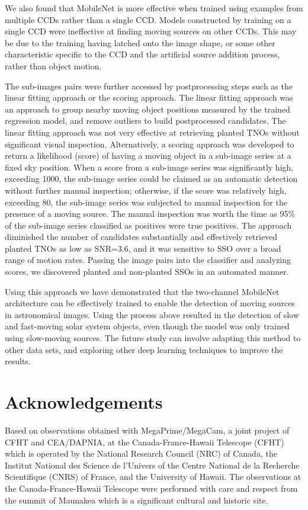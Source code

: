\documentclass{aastex631}
\begin{document}
We also found that MobileNet is more effective when trained using examples from multiple CCDs rather than a single CCD.
Models constructed by training on a single CCD were ineffective at finding moving sources on other CCDs.
This may be due to the training having latched onto the image shape, or some other characteristic specific to the CCD and the artificial source addition process, rather than object motion.

The sub-images pairs were further accessed by postprocessing steps such as the linear fitting approach or the scoring approach.
The linear fitting approach was an approach to group nearby moving object positions measured by the trained regression model, and remove outliers to build postprocessed candidates.
The linear fitting approach was not very effective at retrieving planted TNOs without significant visual inspection.
Alternatively, a scoring approach was developed to return a likelihood (score) of having a moving object in a sub-image series at a fixed sky position.
When a score from a sub-image series was significantly high, exceeding 1000, the sub-image series could be claimed as an automatic detection without further manual inspection; otherwise, if the score was relatively high, exceeding 80, the sub-image series was subjected to manual inspection for the presence of a moving source.
The manual inspection was worth the time as 95\% of the sub-image series classified as positives were true positives.
The approach diminished the number of candidates substantially and effectively retrieved planted TNOs as low as SNR=3.6, and it was sensitive to SSO over a broad range of motion rates.
Passing the image pairs into the classifier and analyzing scores, we discovered planted and non-planted SSOs in an automated manner.

Using this approach we have demonstrated that the two-channel MobileNet architecture can be effectively trained to enable the detection of moving sources in astronomical images.
Using the process above resulted in the detection of slow and fast-moving solar system objects, even though the model was only trained using slow-moving sources.
The future study can involve adapting this method to other data sets, and exploring other deep learning techniques to improve the results.

\section{Acknowledgements}

Based on observations obtained with MegaPrime/MegaCam, a joint project of CFHT and CEA/DAPNIA, at the Canada-France-Hawaii Telescope (CFHT) which is operated by the National Research Council (NRC) of Canada, the Institut National des Science de l'Univers of the Centre National de la Recherche Scientifique (CNRS) of France, and the University of Hawaii. The observations at the Canada-France-Hawaii Telescope were performed with care and respect from the summit of Maunakea which is a significant cultural and historic site.
\end{document}
